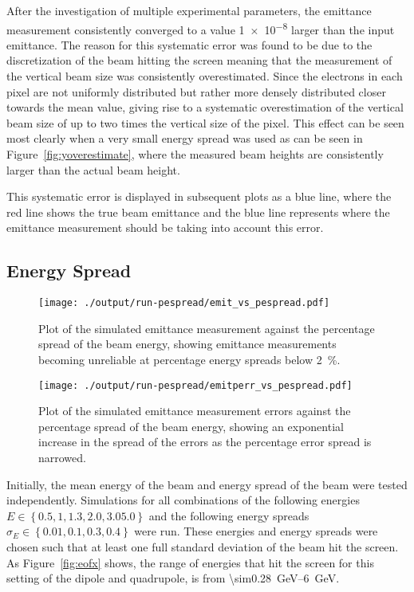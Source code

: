 After the investigation of multiple experimental parameters, the emittance
measurement consistently converged to a value \num{1e-8} larger than the input
emittance. The reason for this systematic error was found to be due to the
discretization of the beam hitting the screen meaning that the measurement of
the vertical beam size was consistently overestimated. Since the electrons in
each pixel are not uniformly distributed but rather more densely distributed
closer towards the mean value, giving rise to a systematic overestimation of the
vertical beam size of up to two times the vertical size of the pixel. This
effect can be seen most clearly when a very small energy spread was used as can
be seen in Figure~\ref{fig:yoverestimate}, where the measured beam heights are
consistently larger than the actual beam height.

This systematic error is displayed in subsequent plots as a blue line, where the
red line shows the true beam emittance and the blue line represents where the
emittance measurement should be taking into account this error.

\subsection{Energy Spread}

\begin{figure*}[!htbp]
	\begin{minipage}[t]{\columnwidth}
		\centering
		\texttt{[image: ./output/run-pespread/emit\_vs\_pespread.pdf]}
		\caption{
			Plot of the simulated emittance measurement against the percentage
			spread of the beam energy, showing emittance measurements becoming
			unreliable at percentage energy spreads below \SI{2}{\percent}.
		}
		\label{fig:emit_pespread}
	\end{minipage}\hfill
	\begin{minipage}[t]{\columnwidth}
		\centering
		\texttt{[image: ./output/run-pespread/emitperr\_vs\_pespread.pdf]}
		\caption{
			Plot of the simulated emittance measurement errors against the
			percentage spread of the beam energy, showing an exponential increase in
			the spread of the errors as the percentage error spread is narrowed.
		}
		\label{fig:emitperr_pespread}
	\end{minipage}
\end{figure*}

Initially, the mean energy of the beam and energy spread of the beam were tested
independently. Simulations for all combinations of the following energies \(E
\in \left\{ 0.5, 1, 1.3, 2.0, 3.0 5.0\right\} \) and the following energy
spreads \(\sigma_E \in \left\{ 0.01, 0.1, 0.3, 0.4 \right\}\) were run.  These
energies and energy spreads were chosen such that at least one full standard
deviation of the beam hit the screen. As Figure~\ref{fig:eofx} shows, the range
of energies that hit the screen for this setting of the dipole and quadrupole,
is from \SIrange{\sim0.28}{6}{\giga\electronvolt}.

